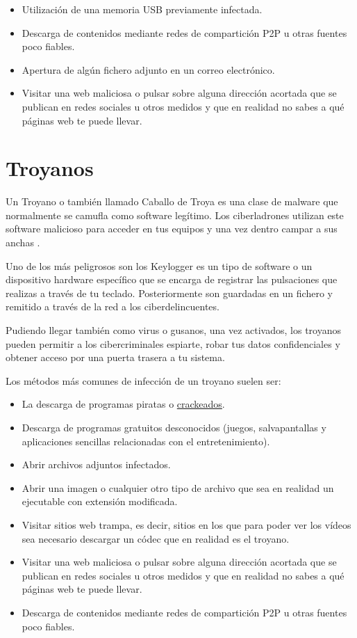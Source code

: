 \documentclass[
  spanish,
  a4paper,
  openany]{book}
\begin{document}
\begin{itemize}
\item
  Utilización de una memoria USB previamente infectada.
\item
  Descarga de contenidos mediante redes de compartición P2P u otras fuentes poco fiables.
\item
  Apertura de algún fichero adjunto en un correo electrónico.
\item
  Visitar una web maliciosa o pulsar sobre alguna dirección acortada que se publican en redes sociales u otros medidos y que en realidad no sabes a qué páginas web te puede llevar.
\end{itemize}

\hypertarget{troyanos}{%
\section{Troyanos}\label{troyanos}}

Un Troyano o también llamado Caballo de Troya es una clase de malware que normalmente se camufla como software legítimo. Los ciberladrones utilizan este software malicioso para acceder en tus equipos y una vez dentro campar a sus anchas \citep{KASPER-troyano}.

Uno de los más peligrosos son los Keylogger es un tipo de software o un dispositivo hardware específico que se encarga de registrar las pulsaciones que realizas a través de tu teclado. Posteriormente son guardadas en un fichero y remitido a través de la red a los ciberdelincuentes.

Pudiendo llegar también como virus o gusanos, una vez activados, los troyanos pueden permitir a los cibercriminales espiarte, robar tus datos confidenciales y obtener acceso por una puerta trasera a tu sistema.

Los métodos más comunes de infección de un troyano suelen ser:

\begin{itemize}
\item
  La descarga de programas piratas o \href{https://es.wikipedia.org/wiki/Cracking_(software)}{crackeados}.
\item
  Descarga de programas gratuitos desconocidos (juegos, salvapantallas y aplicaciones sencillas relacionadas con el entretenimiento).
\item
  Abrir archivos adjuntos infectados.
\item
  Abrir una imagen o cualquier otro tipo de archivo que sea en realidad un ejecutable con extensión modificada.
\item
  Visitar sitios web trampa, es decir, sitios en los que para poder ver los vídeos sea necesario descargar un códec que en realidad es el troyano.
\item
  Visitar una web maliciosa o pulsar sobre alguna dirección acortada que se publican en redes sociales u otros medidos y que en realidad no sabes a qué páginas web te puede llevar.
\item
  Descarga de contenidos mediante redes de compartición P2P u otras fuentes poco fiables.
\end{itemize}
\end{document}
